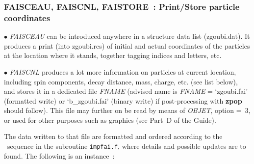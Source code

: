 \newpage

\subsubsection*{FAISCEAU, FAISCNL, FAISTORE~:  Print/Store particle coordinates} \label{FAISCEAU}\label{FAISCNL}
 \label{FAISTORE} 

\medskip 


$\bullet$ \textsl{FAISCEAU}  can be introduced anywhere in a structure 
data list (zgoubi.dat).  It produces a print  (into zgoubi.res) 
of  initial and actual coordinates of the  \IMAX{} particles at the location where it stands, 
together  tagging indices and letters, etc.   

\medskip

\noindent $\bullet$  \textsl{FAISCNL} produces a lot more information on particles at current location, including 
spin components, decay distance, mass, charge, etc. (see list below), and stores it in a 
dedicated file \textsl{FNAME} (advised name is \textsl{FNAME} = `zgoubi.fai'  
(formatted write) or `b\_zgoubi.fai' (binary write) 
if post-processing with \textbf{zpop} should follow).  This file may further on be read by means of  \textsl{OBJET}, 
option \mbox{\KOBJ= 3}, or used for other purposes such as graphics (see Part~D of the Guide).  

\noindent The data written to that file are formatted and  ordered according to the \FORTRAN\ sequence 
in the subroutine \texttt{impfai.f}, where details and possible updates are to found. 
The following is an instance~: 

